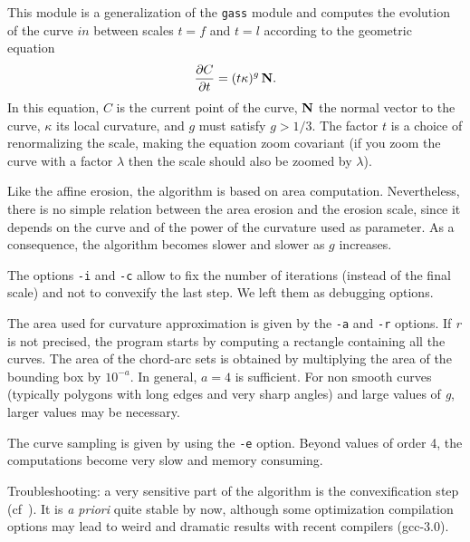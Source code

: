 This module is a generalization of the \verb+gass+ module and computes the
evolution of the curve $in$ between scales $t=f$ and $t=l$ according to
the geometric equation~\cite{cao.moisan:geometric}
$$\frac{\partial C}{\partial t}=(t\kappa)^g \,{\bf N}.$$
In this equation, $C$ is the current point of the curve, $\bf N$
the normal vector to the curve, $\kappa$ its local curvature, and 
$g$ must satisfy $g > 1/3$. 
The factor $t$ is a choice of renormalizing the scale,
making the equation zoom covariant (if you zoom the curve with a factor
$\lambda$ then the scale should also be zoomed by $\lambda$).

\medskip
Like the affine erosion, the algorithm is based on area
computation. Nevertheless, there is no simple relation between the area erosion
and the erosion scale, since it depends on the curve and of the power of the
curvature used as parameter. As a consequence, the algorithm becomes slower and
slower as $g$ increases.  


\medskip
The options \verb+-i+ and \verb+-c+ allow to fix the number of iterations
(instead of the final scale) and not to convexify the last step. We left them
as debugging options. 


\medskip 
The area used for curvature approximation is given by the \verb+-a+ and
\verb+-r+ options. If {\em r} is not precised, the program starts by computing
a rectangle containing all the curves. The area of the chord-arc sets is
obtained by multiplying the area of the bounding box by $10^{-a}$. In general,
$a=4$ is sufficient. For non smooth curves (typically polygons with long edges
and very sharp angles) and large values of {\em g}, larger values may be
necessary.  

\medskip 
The curve sampling is given by using the \verb+-e+ option. Beyond values of
order 4, the computations become very slow and memory consuming. 

\medskip
Troubleshooting: a very sensitive part of the algorithm is the convexification
step (cf~\cite{moisan:affine}). It is {\em a priori} quite stable by now, although some
optimization compilation options may lead to weird and dramatic results with
recent compilers (gcc-3.0).  

